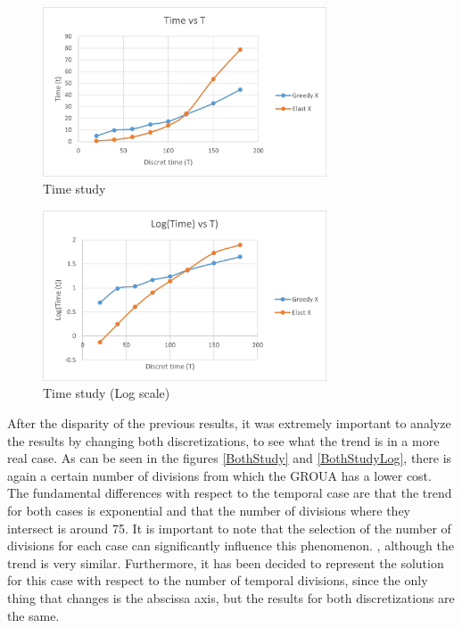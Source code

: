 \documentclass[a4paper, 10pt]{article}
\begin{document}
\begin{figure}
\centering
\includegraphics[width=0.75\textwidth]{TimeStudy.jpg}
\caption{Time study} 
\label{TimeStudy}
\end{figure}

\begin{figure}
\centering
\includegraphics[width=0.75\textwidth]{TimeStudyLog.jpg}
\caption{Time study (Log scale)} 
\label{TimeStudyLog}
\end{figure}


After the disparity of the previous results, it was extremely important to analyze the results by changing both discretizations, to see what the trend is in a more real case. As can be seen in the figures \ref{BothStudy} and \ref{BothStudyLog}, there is again a certain number of divisions from which the GROUA has a lower cost. The fundamental differences with respect to the temporal case are that the trend for both cases is exponential and that the number of divisions where they intersect is around 75. It is important to note that the selection of the number of divisions for each case can significantly influence this phenomenon. , although the trend is very similar. Furthermore, it has been decided to represent the solution for this case with respect to the number of temporal divisions, since the only thing that changes is the abscissa axis, but the results for both discretizations are the same.
\end{document}
